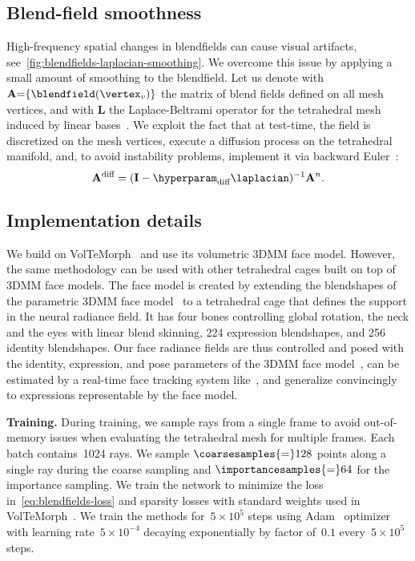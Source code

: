   \subsection{Blend-field smoothness}
    \label{sec:blendfields-smoothness}
    \newcommand{\blendfieldVertices}{\mathbf{A}}
    High-frequency spatial changes in blendfields can cause visual artifacts,
    see~\cref{fig:blendfields-laplacian-smoothing}.
    We overcome this issue by applying a small amount of smoothing to the
    blendfield.
    Let us denote with $\blendfieldVertices{=}\{\blendfield(\vertex_v)\}$ the
    matrix of blend fields defined on all mesh vertices, and with $\mathbf{L}$
    the Laplace-Beltrami operator for the tetrahedral mesh induced by linear
    bases~\cite{irving2004invertible}.
    We exploit the fact that at test-time, the field is discretized on the mesh vertices, execute a diffusion process on the tetrahedral manifold, and, to avoid instability problems, implement it via backward Euler~\cite{desbrun1999implicit}:
    \begin{equation}
      \blendfieldVertices^\text{diff} = (\mathbf{I} - \hyperparam_\text{diff} \laplacian)^{-1} \blendfieldVertices^n.
    \end{equation}

  \subsection{Implementation details}
    \label{sec:blendfields-implementation}
    We build on VolTeMorph~\cite{garbin2024voltemorph} and use its volumetric
    3DMM face model.
    However, the same methodology can be used with other tetrahedral cages
    built on top of 3DMM face models.
    The face model is created by extending the blendshapes of the parametric
    3DMM face model~\cite{wood2021fake} to a tetrahedral cage that defines the
    support in the neural radiance field.
    It has four bones controlling global rotation, the neck and the eyes with
    linear blend skinning, 224 expression blendshapes, and 256 identity
    blendshapes.
    Our face radiance fields are thus controlled and posed with the identity,
    expression, and pose parameters of the 3DMM face
    model~\cite{wood2021fake}, can be estimated by a real-time face tracking
    system like~\cite{wood20223d}, and generalize convincingly to expressions
    representable by the face model.

    \noindent\textbf{Training.}
    During training, we sample rays from a single frame to avoid out-of-memory
    issues when evaluating the tetrahedral mesh for multiple frames.
    Each batch contains~1024 rays.
    We sample $\coarsesamples{=}128$ points along a single ray during the
    coarse sampling and $\importancesamples{=}64$ for the importance sampling.
    We train the network to minimize the loss in~\cref{eq:blendfields-loss}
    and sparsity losses with standard weights used in
    VolTeMorph~\cite{garbin2024voltemorph,hedman2021baking}.
    We train the methods for~$5{\times}10^5$ steps using
    Adam~\cite{kingma2014adam} optimizer with learning rate~$5{\times}10^{-4}$
    decaying exponentially by factor of~$0.1$ every~$5{\times}10^5$ steps.

